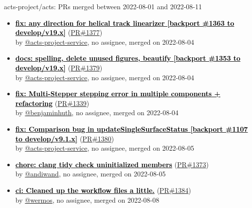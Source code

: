 \begin{frame}[allowframebreaks]{ acts-project/acts: PRs merged 
between 2022-08-01 and 2022-08-11
}
\begin{itemize}
    \item
    \prmerged\textbf{\href{https://github.com/acts-project/acts/pull/1377}{\textcolor{black}{fix: any direction for helical track linearizer [backport \#1363 to develop/v19.x]}}}
    (\href{https://github.com/acts-project/acts/pull/1377}{PR\#1377}) \\
    by \href{https://github.com/acts-project-service}{@acts-project-service}, {}no assignee, merged on 2022-08-04

    \item
    \prmerged\textbf{\href{https://github.com/acts-project/acts/pull/1379}{\textcolor{black}{docs: spelling, delete unused figures, beautify [backport \#1353 to develop/v19.x]}}}
    (\href{https://github.com/acts-project/acts/pull/1379}{PR\#1379}) \\
    by \href{https://github.com/acts-project-service}{@acts-project-service}, {}no assignee, merged on 2022-08-04

    \item
    \prmerged\textbf{\href{https://github.com/acts-project/acts/pull/1339}{\textcolor{black}{fix: Multi-Stepper stepping error in multiple components + refactoring}}}
    (\href{https://github.com/acts-project/acts/pull/1339}{PR\#1339}) \\
    by \href{https://github.com/benjaminhuth}{@benjaminhuth}, {}no assignee, merged on 2022-08-04

    \item
    \prmerged\textbf{\href{https://github.com/acts-project/acts/pull/1380}{\textcolor{black}{fix: Comparison bug in updateSingleSurfaceStatus [backport \#1107 to develop/v9.1.x]}}}
    (\href{https://github.com/acts-project/acts/pull/1380}{PR\#1380}) \\
    by \href{https://github.com/acts-project-service}{@acts-project-service}, {}no assignee, merged on 2022-08-05

    \item
    \prmerged\textbf{\href{https://github.com/acts-project/acts/pull/1373}{\textcolor{black}{chore: clang tidy check uninitialized members}}}
    (\href{https://github.com/acts-project/acts/pull/1373}{PR\#1373}) \\
    by \href{https://github.com/andiwand}{@andiwand}, {}no assignee, merged on 2022-08-05

    \item
    \prmerged\textbf{\href{https://github.com/acts-project/acts/pull/1384}{\textcolor{black}{ci: Cleaned up the workflow files a little.}}}
    (\href{https://github.com/acts-project/acts/pull/1384}{PR\#1384}) \\
    by \href{https://github.com/wermos}{@wermos}, {}no assignee, merged on 2022-08-08


\end{itemize}
\end{frame}
